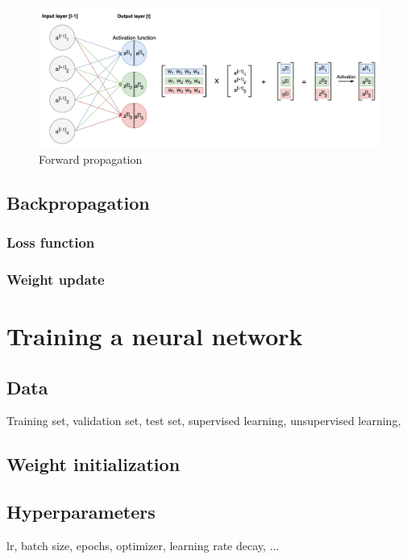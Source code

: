 \begin{figure}[!h]
\centering
\includegraphics[width=1\textwidth, keepaspectratio=true]{./figures/forward_propagation.png}
\caption{Forward propagation }
\label{forward_propagation}
\end{figure}


\subsection{Backpropagation}

\subsubsection{Loss function}

\subsubsection{Weight update}




\section{Training a neural network}

\subsection{Data}
Training set, validation set, test set, supervised learning, unsupervised learning,

\subsection{Weight initialization}

\subsection{Hyperparameters}
lr, batch size, epochs, optimizer, learning rate decay, ...




